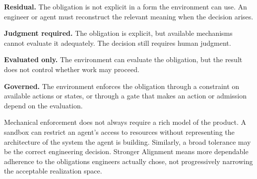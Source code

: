 
\textbf{Residual.} The obligation is not explicit in a form the environment can use. An engineer or agent must reconstruct the relevant meaning when the decision arises.


\textbf{Judgment required.} The obligation is explicit, but available mechanisms cannot evaluate it adequately. The decision still requires human judgment.


\textbf{Evaluated only.} The environment can evaluate the obligation, but the result does not control whether work may proceed.


\textbf{Governed.} The environment enforces the obligation through a constraint on available actions or states, or through a gate that makes an action or admission depend on the evaluation.


Mechanical enforcement does not always require a rich model of the product. A sandbox can restrict an agent's access to resources without representing the architecture of the system the agent is building. Similarly, a broad tolerance may be the correct engineering decision. Stronger Alignment means more dependable adherence to the obligations engineers actually chose, not progressively narrowing the acceptable realization space.


